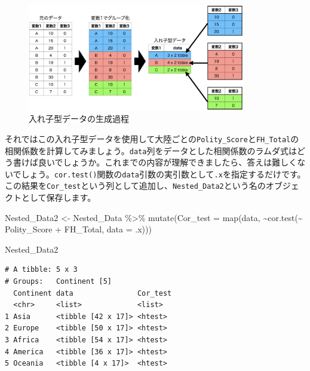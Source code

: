\documentclass[
  a4paper,
  pandoc,
  ja=standard,
  jafont=haranoaji]{bxjsbook}
\newenvironment{Shaded}{\begin{snugshade}}{\end{snugshade}}
\newcommand{\AttributeTok}[1]{\textcolor[rgb]{0.00,0.48,0.65}{#1}}
\newcommand{\FunctionTok}[1]{\textcolor[rgb]{0.28,0.35,0.67}{#1}}
\newcommand{\NormalTok}[1]{\textcolor[rgb]{0.00,0.48,0.65}{#1}}
\newcommand{\OtherTok}[1]{\textcolor[rgb]{0.00,0.48,0.65}{#1}}
\newcommand{\SpecialCharTok}[1]{\textcolor[rgb]{0.37,0.37,0.37}{#1}}
\begin{document}
\begin{figure}

{\centering \includegraphics[width=0.85\textwidth,height=\textheight]{./Figs/Iteration/nested_data.png}

}

\caption{\label{fig-nested_data}入れ子型データの生成過程}

\end{figure}

それではこの入れ子型データを使用して大陸ごとの\texttt{Polity\_Score}と\texttt{FH\_Total}の相関係数を計算してみましょう。\texttt{data}列をデータとした相関係数のラムダ式はどう書けば良いでしょうか。これまでの内容が理解できましたら、答えは難しくないでしょう。\texttt{cor.test()}関数の\texttt{data}引数の実引数として\texttt{.x}を指定するだけです。この結果を\texttt{Cor\_test}という列として追加し、\texttt{Nested\_Data2}という名のオブジェクトとして保存します。

\begin{Shaded}
\begin{Highlighting}[numbers=left,,]
\NormalTok{Nested\_Data2 }\OtherTok{\textless{}{-}}\NormalTok{ Nested\_Data }\SpecialCharTok{\%\textgreater{}\%}
  \FunctionTok{mutate}\NormalTok{(}\AttributeTok{Cor\_test =} \FunctionTok{map}\NormalTok{(data, }\SpecialCharTok{\textasciitilde{}}\FunctionTok{cor.test}\NormalTok{(}\SpecialCharTok{\textasciitilde{}}\NormalTok{ Polity\_Score }\SpecialCharTok{+}\NormalTok{ FH\_Total, }\AttributeTok{data =}\NormalTok{ .x)))}

\NormalTok{Nested\_Data2}
\end{Highlighting}
\end{Shaded}

\begin{verbatim}
# A tibble: 5 x 3
# Groups:   Continent [5]
  Continent data               Cor_test
  <chr>     <list>             <list>  
1 Asia      <tibble [42 x 17]> <htest> 
2 Europe    <tibble [50 x 17]> <htest> 
3 Africa    <tibble [54 x 17]> <htest> 
4 America   <tibble [36 x 17]> <htest> 
5 Oceania   <tibble [4 x 17]>  <htest> 
\end{verbatim}
\end{document}

